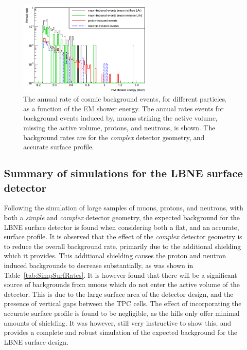 \begin{figure}
  \centering
  \includegraphics[width=0.6\textwidth]{SurfEDistAllCuts}
  \caption[The annual rate of cosmic background events, for different particles, as a function of the EM shower energy]
          {The annual rate of cosmic background events, for different particles, as a function of the EM shower energy. The annual rates events for background events induced by, muons striking the active volume, missing the active volume, protons, and neutrons, is shown. The background rates are for the \emph{complex} detector geometry, and accurate surface profile.}
  \label{fig:SurfEDistCuts}
\end{figure}

\subsection{Summary of simulations for the LBNE surface detector}
Following the simulation of large samples of muons, protons, and neutrons, with both a \emph{simple} and \emph{complex} detector geometry, the expected background for the LBNE surface detector is found when considering both a flat, and an accurate, surface profile. It is observed that the effect of the \emph{complex} detector geometry is to reduce the overall background rate, primarily due to the additional shielding which it provides. This additional shielding causes the proton and neutron induced backgrounds to decrease substantially, as was shown in Table~\ref{tab:SimpSurfRates}. It is however found that there will be a significant source of backgrounds from muons which do not enter the active volume of the detector. This is due to the large surface area of the detector design, and the presence of vertical gaps between the TPC cells. The effect of incorporating the accurate surface profile is found to be negligible, as the hills only offer minimal amounts of shielding. It was however, still very instructive to show this, and provides a complete and robust simulation of the expected background for the LBNE surface design. \\


